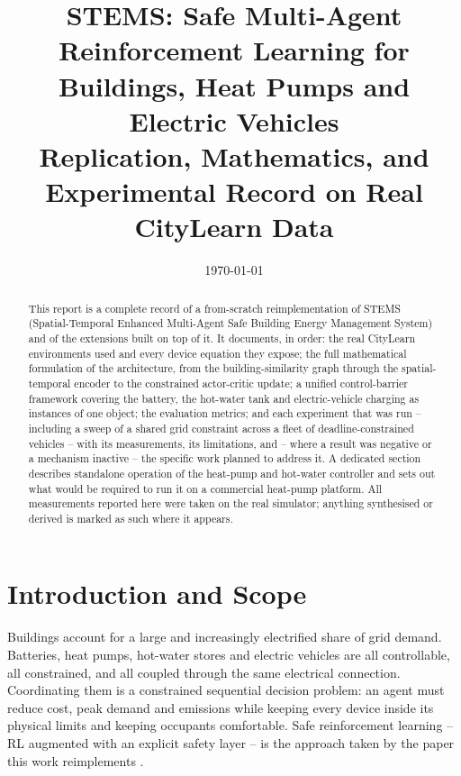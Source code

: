 \documentclass[11pt]{article}
\title{\textbf{STEMS: Safe Multi-Agent Reinforcement Learning for \\
Buildings, Heat Pumps and Electric Vehicles} \\[6pt]
\large Replication, Mathematics, and Experimental Record on Real CityLearn Data}
\author{}
\date{\today}
\begin{document}
\maketitle

\begin{abstract}
This report is a complete record of a from-scratch reimplementation of STEMS
(Spatial-Temporal Enhanced Multi-Agent Safe Building Energy Management System)
\cite{stems2025} and of the extensions built on top of it. It documents, in
order: the real CityLearn environments used and every device equation they
expose; the full mathematical formulation of the architecture, from the
building-similarity graph through the spatial-temporal encoder to the
constrained actor-critic update; a unified control-barrier framework covering
the battery, the hot-water tank and electric-vehicle charging as instances of
one object; the evaluation metrics; and each experiment that was run -- including a sweep of a shared grid
constraint across a fleet of deadline-constrained vehicles -- with its
measurements, its limitations, and -- where a result was negative or a mechanism
inactive -- the specific work planned to address it. A dedicated section
describes standalone operation of the heat-pump and hot-water controller and
sets out what would be required to run it on a commercial heat-pump platform.
All measurements reported here were taken on the real simulator; anything
synthesised or derived is marked as such where it appears.
\end{abstract}

\tableofcontents
\newpage

\section{Introduction and Scope}
\label{sec:intro}

Buildings account for a large and increasingly electrified share of grid demand.
Batteries, heat pumps, hot-water stores and electric vehicles are all
controllable, all constrained, and all coupled through the same electrical
connection. Coordinating them is a constrained sequential decision problem: an
agent must reduce cost, peak demand and emissions while keeping every device
inside its physical limits and keeping occupants comfortable. Safe reinforcement
learning -- RL augmented with an explicit safety layer -- is the approach taken by
the paper this work reimplements \cite{stems2025}.
\end{document}
